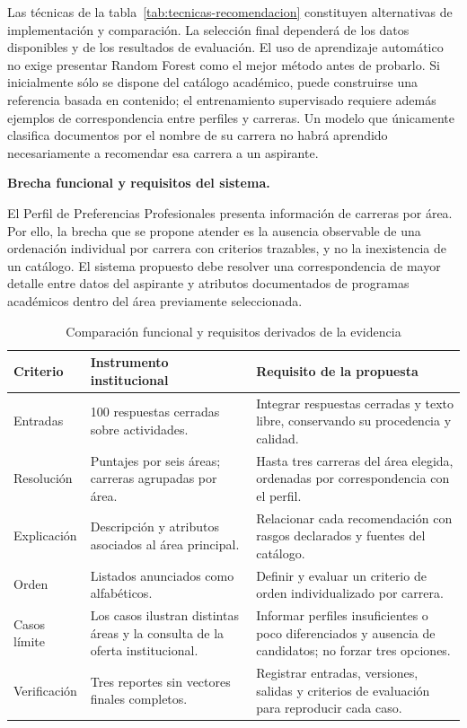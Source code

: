 Las técnicas de la tabla~\ref{tab:tecnicas-recomendacion} constituyen alternativas de implementación y comparación. La selección final dependerá de los datos disponibles y de los resultados de evaluación. El uso de aprendizaje automático no exige presentar Random Forest como el mejor método antes de probarlo. Si inicialmente sólo se dispone del catálogo académico, puede construirse una referencia basada en contenido; el entrenamiento supervisado requiere además ejemplos de correspondencia entre perfiles y carreras. Un modelo que únicamente clasifica documentos por el nombre de su carrera no habrá aprendido necesariamente a recomendar esa carrera a un aspirante.

\noindent\textbf{Brecha funcional y requisitos del sistema.}\par\smallskip

El Perfil de Preferencias Profesionales presenta información de carreras por área. Por ello, la brecha que se propone atender es la ausencia observable de una ordenación individual por carrera con criterios trazables, y no la inexistencia de un catálogo. El sistema propuesto debe resolver una correspondencia de mayor detalle entre datos del aspirante y atributos documentados de programas académicos dentro del área previamente seleccionada.

\begin{table}[htbp]
\centering
\small
\caption{Comparación funcional y requisitos derivados de la evidencia}
\label{tab:comparativa-ppp}
\begin{tabularx}{\textwidth}{L{0.20\textwidth}XX}
\toprule
\textbf{Criterio} & \textbf{Instrumento institucional} & \textbf{Requisito de la propuesta} \\
\midrule
Entradas & 100 respuestas cerradas sobre actividades. & Integrar respuestas cerradas y texto libre, conservando su procedencia y calidad. \\
Resolución & Puntajes por seis áreas; carreras agrupadas por área. & Hasta tres carreras del área elegida, ordenadas por correspondencia con el perfil. \\
Explicación & Descripción y atributos asociados al área principal. & Relacionar cada recomendación con rasgos declarados y fuentes del catálogo. \\
Orden & Listados anunciados como alfabéticos. & Definir y evaluar un criterio de orden individualizado por carrera. \\
Casos límite & Los casos ilustran distintas áreas y la consulta de la oferta institucional. & Informar perfiles insuficientes o poco diferenciados y ausencia de candidatos; no forzar tres opciones. \\
Verificación & Tres reportes sin vectores finales completos. & Registrar entradas, versiones, salidas y criterios de evaluación para reproducir cada caso. \\
\bottomrule
\end{tabularx}
\end{table}

